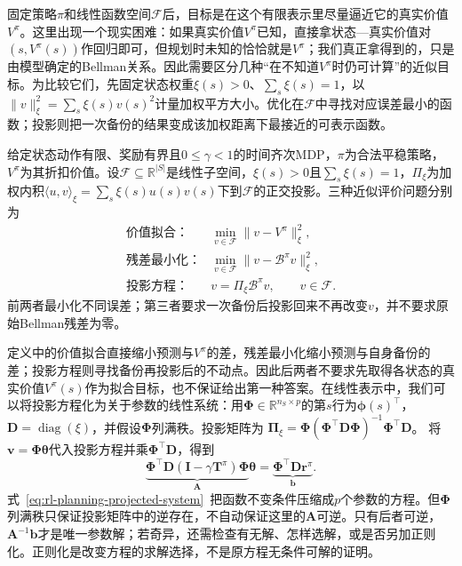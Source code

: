 固定策略$\pi$和线性函数空间$\mathcal F$后，目标是在这个有限表示里尽量逼近它的真实价值$V^\pi$。这里出现一个现实困难：如果真实价值$V^\pi$已知，直接拿状态—真实价值对$(s,V^\pi(s))$作回归即可，但规划时未知的恰恰就是$V^\pi$；我们真正拿得到的，只是由模型确定的Bellman关系。因此需要区分几种“在不知道$V^\pi$时仍可计算”的近似目标。为比较它们，先固定状态权重$\xi(s)>0$、$\sum_s\xi(s)=1$，以
$\lVert v\rVert_\xi^2=\sum_s\xi(s)v(s)^2$计量加权平方大小。优化在$\mathcal F$中寻找对应误差最小的函数；投影则把一次备份的结果变成该加权距离下最接近的可表示函数。

\begin{definition}[三种近似评价对象]
 \label{def:rl-planning-projected-evaluation}
 给定状态动作有限、奖励有界且$0\leq\gamma<1$的时间齐次MDP，$\pi$为合法平稳策略，$V^\pi$为其折扣价值。设$\mathcal F\subseteq\mathbb R^{|S|}$是线性子空间，$\xi(s)>0$且$\sum_s\xi(s)=1$，$\Pi_\xi$为加权内积$\langle u,v\rangle_\xi=\sum_s\xi(s)u(s)v(s)$下到$\mathcal F$的正交投影。三种近似评价问题分别为
 \[
 \begin{array}{ll}
 \text{价值拟合：}&\displaystyle\min_{v\in\mathcal F}\lVert v-V^\pi\rVert_\xi^2,\\
 \text{残差最小化：}&\displaystyle\min_{v\in\mathcal F}\lVert v-\mathcal B^\pi v\rVert_\xi^2,\\
 \text{投影方程：}&v=\Pi_\xi \mathcal B^\pi v,\qquad v\in\mathcal F.
 \end{array}
 \]
 前两者最小化不同误差；第三者要求一次备份后投影回来不再改变$v$，并不要求原始Bellman残差为零。
\end{definition}

定义中的价值拟合直接缩小预测与$V^\pi$的差，残差最小化缩小预测与自身备份的差；投影方程则寻找备份再投影后的不动点。因此后两者不要求先取得各状态的真实价值$V^\pi(s)$作为拟合目标，也不保证给出第一种答案。在线性表示中，我们可以将投影方程化为关于参数的线性系统：用$\bm\Phi\in\mathbb R^{n_S\times p}$的第$s$行为$\bm\phi(s)^\top$，
$\bm D=\operatorname{diag}(\xi)$，并假设$\bm\Phi$列满秩。投影矩阵为
$\bm\Pi_\xi=\bm\Phi(\bm\Phi^\top\bm D\bm\Phi)^{-1}\bm\Phi^\top\bm D$。
将$\bm v=\bm\Phi\bm\theta$代入投影方程并乘$\bm\Phi^\top\bm D$，得到
\begin{equation}
 \underbrace{\bm\Phi^\top\bm D(\bm I-\gamma\bm T^\pi)\bm\Phi}_{\bm A}
 \bm\theta
 =\underbrace{\bm\Phi^\top\bm D\bm r^\pi}_{\bm b}.
 \label{eq:rl-planning-projected-system}
\end{equation}
式~\eqref{eq:rl-planning-projected-system}~把函数不变条件压缩成$p$个参数的方程。但$\bm\Phi$列满秩只保证投影矩阵中的逆存在，不自动保证这里的$\bm A$可逆。只有后者可逆，$\bm A^{-1}\bm b$才是唯一参数解；若奇异，还需检查有无解、怎样选解，或是否另加正则化。正则化是改变方程的求解选择，不是原方程无条件可解的证明。

